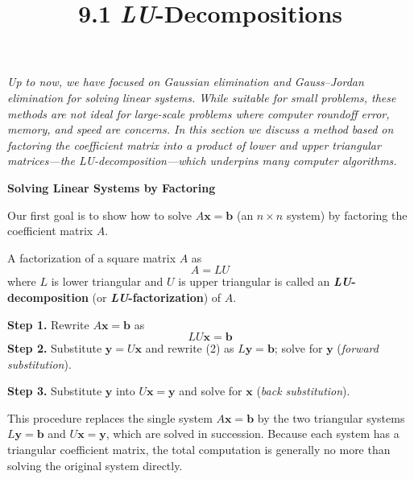 \documentclass{article}
\title{9.1 \textit{LU}-Decompositions}
\date{}
\author{}
\newcommand{\redheading}[1]{{\vspace{2mm}\noindent\Large\bfseries\color{red!55!black} #1\par}\vspace{2mm}}
\begin{document}
\maketitle

{\itshape\color{blue!45!black}
Up to now, we have focused on Gaussian elimination and Gauss--Jordan elimination for
solving linear systems. While suitable for small problems, these methods are not ideal
for large-scale problems where computer roundoff error, memory, and speed are concerns.
In this section we discuss a method based on factoring the coefficient matrix into a
product of lower and upper triangular matrices---the \emph{LU-decomposition}---which
underpins many computer algorithms.\par}

\vspace{2mm}

\redheading{Solving Linear Systems by Factoring}

Our first goal is to show how to solve $A\mathbf{x} = \mathbf{b}$ (an $n\times n$
system) by factoring the coefficient matrix $A$.

\begin{tcolorbox}[colback=teal!4, colframe=teal!65!black,
  title={\textbf{Definition 1}}, boxrule=0.5mm, arc=3mm]
A factorization of a square matrix $A$ as
\[
  A = LU \tag{1}
\]
where $L$ is lower triangular and $U$ is upper triangular is called an
\textbf{\textit{LU}-decomposition} (or \textbf{\textit{LU}-factorization}) of $A$.
\end{tcolorbox}

\begin{tcolorbox}[colback=blue!4, colframe=blue!55!black,
  title={\textbf{The Method of \textit{LU}-Decomposition}}, boxrule=0.5mm, arc=3mm]
\textbf{Step 1.} Rewrite $A\mathbf{x} = \mathbf{b}$ as
\[
  LU\mathbf{x} = \mathbf{b} \tag{2}
\]
\textbf{Step 2.} Substitute $\mathbf{y} = U\mathbf{x}$ and rewrite (2) as
$L\mathbf{y} = \mathbf{b}$; solve for $\mathbf{y}$ (\emph{forward substitution}).

\textbf{Step 3.} Substitute $\mathbf{y}$ into $U\mathbf{x} = \mathbf{y}$ and solve for
$\mathbf{x}$ (\emph{back substitution}).
\end{tcolorbox}

This procedure replaces the single system $A\mathbf{x} = \mathbf{b}$ by the two
triangular systems $L\mathbf{y} = \mathbf{b}$ and $U\mathbf{x} = \mathbf{y}$, which are
solved in succession. Because each system has a triangular coefficient matrix, the total
computation is generally no more than solving the original system directly.
\end{document}
